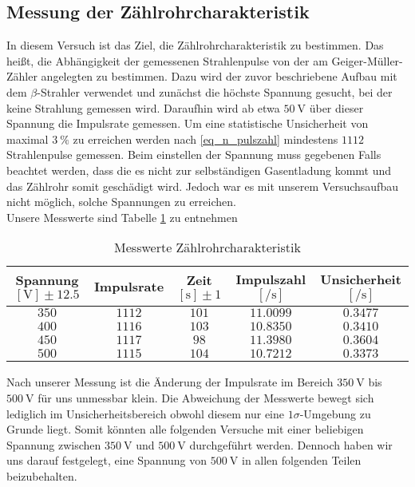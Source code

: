 \subsection{Messung der Zählrohrcharakteristik}
In diesem Versuch ist das Ziel, die Zählrohrcharakteristik zu bestimmen. Das heißt, die Abhängigkeit der gemessenen Strahlenpulse von der am Geiger-Müller-Zähler angelegten zu bestimmen. Dazu wird der zuvor beschriebene Aufbau mit dem $ \beta $-Strahler verwendet und zunächst die höchste Spannung gesucht, bei der keine Strahlung gemessen wird. Daraufhin wird ab etwa $ \SI{50}{\volt} $ über dieser Spannung die Impulsrate gemessen. Um eine statistische Unsicherheit von maximal $ \SI{3}{\percent} $ zu erreichen werden nach \eqref{eq_n_pulszahl} mindestens $ 1112 $ Strahlenpulse gemessen. Beim einstellen der Spannung muss gegebenen Falls beachtet werden, dass die es nicht zur selbständigen Gasentladung kommt und das Zählrohr somit geschädigt wird. Jedoch war es mit unserem Versuchsaufbau nicht möglich, solche Spannungen zu erreichen. \\
Unsere Messwerte sind Tabelle \ref{tab:mess_1} zu entnehmen

\begin{table}[h!]
\begin{tabular}{c|c|c|c|c}
Spannung $ [\si{\volt}] \pm \num{12.5} $ & Impulsrate & Zeit $ [\si{\second}] \pm 1$ & Impulszahl $ [\si{\per\second}] $ & Unsicherheit $ [\si{\per\second}] $ \\ \hline
$ 350 $ & $ 1112 $ & $ 101 $ & $ \num{11.0099} $ & $ \num{0.3477} $ \\
$ 400 $ & $ 1116 $ & $ 103 $ & $ \num{10.8350} $ & $ \num{0.3410} $ \\
$ 450 $ & $ 1117 $ & $ 98 $ & $ \num{11.3980} $ & $ \num{0.3604} $ \\
$ 500 $ & $ 1115 $ & $ 104 $ & $ \num{10.7212} $ & $ \num{0.3373} $ \\
\end{tabular}
\caption{Messwerte Zählrohrcharakteristik}
\label{tab:mess_1}
\end{table}

Nach unserer Messung ist die Änderung der Impulsrate im Bereich $ \SI{350}{\volt} $ bis $ \SI{500}{\volt} $ für uns unmessbar klein. Die Abweichung der Messwerte bewegt sich lediglich im Unsicherheitsbereich obwohl diesem nur eine $ 1\sigma $-Umgebung zu Grunde liegt. Somit könnten alle folgenden Versuche mit einer beliebigen Spannung zwischen $ \SI{350}{\volt} $
 und $ \SI{500}{\volt} $ durchgeführt werden. Dennoch haben wir uns darauf festgelegt, eine Spannung von $ \SI{500}{\volt} $ in allen folgenden Teilen beizubehalten.
